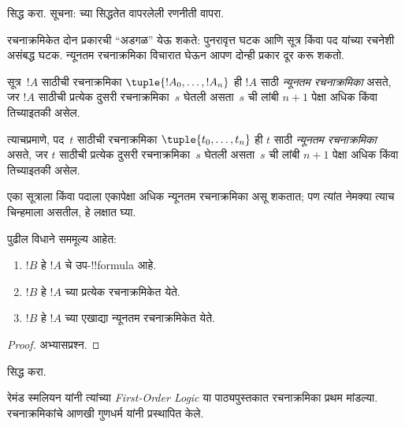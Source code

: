 \documentclass[../../../include/open-logic-section]{subfiles}
\begin{document}
\begin{prob}
 सिद्ध करा.
सूचना:  च्या सिद्धतेत वापरलेली
रणनीती वापरा.
\end{prob}

रचनाक्रमिकेत दोन प्रकारची ``अडगळ'' येऊ शकते: पुनरावृत्त घटक आणि सूत्र
किंवा पद यांच्या रचनेशी असंबद्ध घटक. न्यूनतम रचनाक्रमिका विचारात घेऊन
आपण दोन्ही प्रकार दूर करू शकतो.

\begin{defn}
\raggedright
सूत्र~$!A$ साठीची रचनाक्रमिका $\tuple{!A_0, \ldots, !A_n}$ ही
$!A$ साठी \emph{न्यूनतम रचनाक्रमिका} असते, जर $!A$ साठीची प्रत्येक
दुसरी रचनाक्रमिका~$s$ घेतली असता~$s$ ची लांबी $n+1$ पेक्षा अधिक किंवा
तिच्याइतकी असेल.

त्याचप्रमाणे, पद~$t$ साठीची रचनाक्रमिका $\tuple{t_0, \ldots, t_n}$ ही
$t$ साठी \emph{न्यूनतम रचनाक्रमिका} असते, जर $t$ साठीची प्रत्येक
दुसरी रचनाक्रमिका~$s$ घेतली असता~$s$ ची लांबी $n+1$ पेक्षा अधिक किंवा
तिच्याइतकी असेल.
\end{defn}

एका सूत्राला किंवा पदाला एकापेक्षा अधिक न्यूनतम रचनाक्रमिका असू शकतात;
पण त्यांत नेमक्या त्याच चिन्हमाला असतील, हे लक्षात घ्या.

\begin{prop}
पुढील विधाने सममूल्य आहेत:
\begin{enumerate}
    \item $!B$ हे $!A$ चे उप-!!{formula} आहे.
    \item $!B$ हे $!A$ च्या प्रत्येक रचनाक्रमिकेत येते.
    \item $!B$ हे $!A$ च्या एखाद्या न्यूनतम रचनाक्रमिकेत येते.
\end{enumerate}
\end{prop}

\begin{proof}
अभ्यासप्रश्न.
\end{proof}

\begin{prob}
 सिद्ध करा.
\end{prob}

\begin{history}
रेमंड स्मलियन यांनी त्यांच्या \emph{First-Order Logic}
\citep{Smullyan1968} या पाठ्यपुस्तकात रचनाक्रमिका प्रथम मांडल्या.
रचनाक्रमिकांचे आणखी गुणधर्म \citet{Zuckerman1973} यांनी प्रस्थापित केले.
\end{history}
\end{document}
